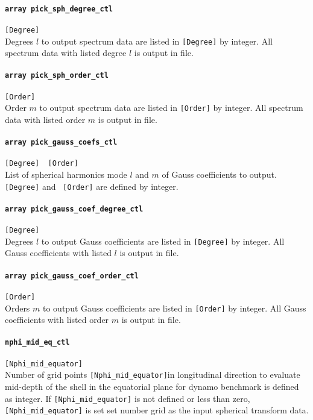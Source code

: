 \paragraph{\tt array pick\_sph\_degree\_ctl}
\label{href_t:pick_sph_degree_ctl}
\verb|[Degree]| \\
Degrees $l$ to output spectrum data are listed in \verb|[Degree]| by integer. All spectrum data with listed degree $l$ is output in file.

\paragraph{\tt array pick\_sph\_order\_ctl}
\label{href_t:pick_sph_order_ctl}
\verb|[Order]| \\
Order $m$ to output spectrum data are listed in \verb|[Order]| by integer. All spectrum data with listed order $m$ is output in file.

\paragraph{\tt array pick\_gauss\_coefs\_ctl}
\label{href_t:pick_gauss_coefs_ctl}
\verb|[Degree]  [Order]| \\
List of spherical harmonics mode $l$ and $m$ of Gauss coefficients to output. \verb|[Degree]| and \verb| [Order]| are defined by integer.

\paragraph{\tt array pick\_gauss\_coef\_degree\_ctl}
\label{href_t:pick_gauss_coef_degree_ctl}
\verb|[Degree]| \\
Degrees $l$ to output Gauss coefficients are listed in \verb|[Degree]| by integer. All Gauss coefficients with listed $l$ is output in file.

\paragraph{\tt array pick\_gauss\_coef\_order\_ctl}
\label{href_t:pick_gauss_coef_order_ctl}
\verb|[Order]| \\
Orders $m$ to output Gauss coefficients are listed in \verb|[Order]| by integer. All Gauss coefficients with listed order $m$ is output in file.

\paragraph{\tt nphi\_mid\_eq\_ctl}
\label{href_t:nphi_mid_eq_ctl}
\verb|[Nphi_mid_equator]| \\
Number of grid points \verb|[Nphi_mid_equator]|in longitudinal direction to evaluate mid-depth of the shell in the equatorial plane for dynamo benchmark is defined as integer. If \verb|[Nphi_mid_equator]| is not defined or less than zero, \verb|[Nphi_mid_equator]| is set set number grid as the input spherical transform data. 

